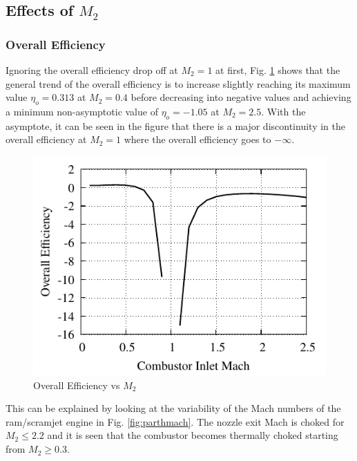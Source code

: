 \documentclass[conf]{new-aiaa} %
\begin{document}
\subsection{Effects of \texorpdfstring{$M_2$}{M2}} %

\subsubsection{Overall Efficiency}
Ignoring the overall efficiency drop off at $M_2=1$ at first, Fig. \ref{fig:parthetao} shows that the general trend of the overall efficiency is to increase slightly reaching its maximum value $\eta_o=0.313$ at $M_2=0.4$ before decreasing into negative values and achieving a minimum non-asymptotic value of $\eta_o=-1.05$ at $M_2=2.5$. With the asymptote, it can be seen in the figure that there is a major discontinuity in the overall efficiency at $M_2=1$ where the overall efficiency goes to $-\infty$. 

\begin{figure}[H] %
    \centering
    \includegraphics[]{media/performance_parameter_files/part_h_eta_o.pdf}
    \caption{\label{fig:parthetao}Overall Efficiency vs \texorpdfstring{\textit{$M_2$}}{M2}}
\end{figure}
This can be explained by looking at the variability of the Mach numbers of the ram/scramjet engine in Fig. \ref{fig:parthmach}. The nozzle exit Mach is choked for $M_2\leq2.2$ and it is seen that the combustor becomes thermally choked starting from $M_2\geq0.3$.
\end{document}
